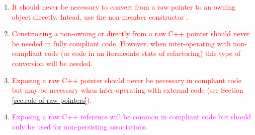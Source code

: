 {\begin{minipage}{\textwidth}
\begin{enumerate}
%
{}\item\label{conv:arcp-owning}\textcolor{red}{It should never be
necessary to convert from a raw pointer to an owning {}
object directly.  Intead, use the non-member constructor
{}.}
%
{}\item\label{conv:arcp-nonowning}\textcolor{red}{Constructing a
non-owning {} or {} directly from a raw
C++ pointer should never be needed in fully compliant code.  However,
when inter-operating with non-compliant code (or code in an itermedate
state of refactoring) this type of conversion will be needed.}
%
{}\item\label{conv:array-expose-raw-ptr}\textcolor{red}{Exposing a raw
C++ pointer should never be necessary in compliant code but may be
necessary when inter-operating with external code (see Section
{}\ref{sec:role-of-raw-pointers}).}
%
{}\item\label{conv:array-expose-raw-ref}\textcolor{magenta}{Exposing a
raw C++ reference will be common in compliant code but should only be
used for non-persisting associations.}
%
\end{enumerate}

\end{minipage}}

